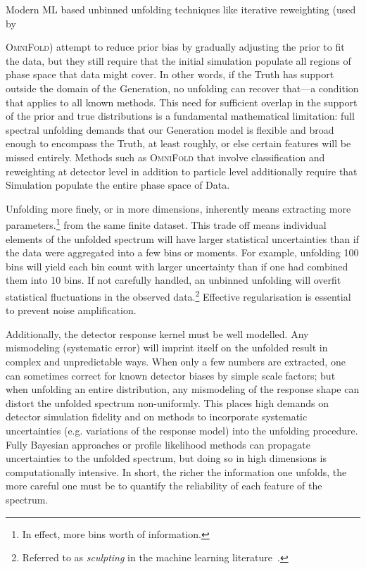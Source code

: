         Modern ML based unbinned unfolding techniques like iterative reweighting (used by {\textsc{OmniFold}) attempt to reduce prior bias by gradually adjusting the prior to fit the data, but they still require that the initial simulation populate all regions of phase space that data might cover.
        In other words, if the Truth has support outside the domain of the Generation, no unfolding can recover that---a condition that applies to all known methods.
        This need for sufficient overlap in the support of the prior and true distributions is a fundamental mathematical limitation: full spectral unfolding demands that our Generation model is flexible and broad enough to encompass the Truth, at least roughly, or else certain features will be missed entirely.
        Methods such as \textsc{OmniFold} that involve classification and reweighting at detector level in addition to particle level additionally require that Simulation populate the entire phase space of Data.

        Unfolding more finely, or in more dimensions, inherently means extracting more parameters.\footnote{In effect, more bins worth of information.} from the same finite dataset.
        This trade off means individual elements of the unfolded spectrum will have larger statistical uncertainties than if the data were aggregated into a few bins or moments.
        For example, unfolding 100 bins will yield each bin count with larger uncertainty than if one had combined them into 10 bins.
        If not carefully handled, an unbinned unfolding will overfit statistical fluctuations in the observed data.\footnote{Referred to as \emph{sculpting} in the machine learning literature~\cite{Corso2023, ParticleDataGroup:2022pth}.}
        Effective regularisation is essential to prevent noise amplification.
        
        Additionally, the detector response kernel must be well modelled.
        Any mismodeling (systematic error) will imprint itself on the unfolded result in complex and unpredictable ways.
        When only a few numbers are extracted, one can sometimes correct for known detector biases by simple scale factors; but when unfolding an entire distribution, any mismodeling of the response shape can distort the unfolded spectrum non-uniformly.
        This places high demands on detector simulation fidelity and on methods to incorporate systematic uncertainties (e.g. variations of the response model) into the unfolding procedure.
        Fully Bayesian approaches or profile likelihood methods can propagate uncertainties to the unfolded spectrum, but doing so in high dimensions is computationally intensive.
        In short, the richer the information one unfolds, the more careful one must be to quantify the reliability of each feature of the spectrum.

}
